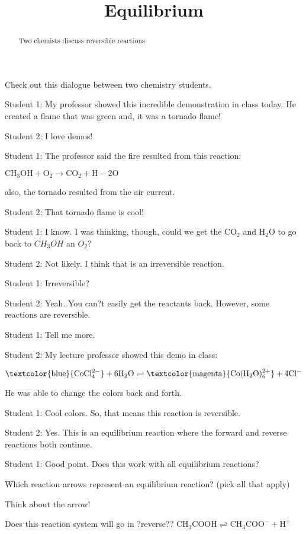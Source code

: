 \documentclass{ximera}
\title{Equilibrium}
\begin{document}
\begin{abstract}
Two chemists discuss reversible reactions.
\end{abstract}
\maketitle




Check out this dialogue between two chemistry students. 

Student 1: My professor showed this incredible demonstration in class today. He created a flame that was green and, it was a tornado flame!

Student 2: I love demos!

Student 1: The professor said the fire resulted from this reaction:

        $\mathrm{CH_3OH + O_2 \rightarrow CO_2 + H-2O}$

    also, the tornado resulted from the air current. 

Student 2: That tornado flame is cool!

Student 1: I know. I was thinking, though, could we get the $\mathrm{CO_2}$ and $\mathrm{H_2O}$ to go back to $CH_3OH$ an $O_2$?

Student 2: Not likely. I think that is an irreversible reaction. 

Student 1: Irreversible?

Student 2: Yeah. You can?t easily get the reactants back. However, some reactions are reversible. 

Student 1: Tell me more.

Student 2: My lecture professor showed this demo in class:

    $\mathrm{\textcolor{blue}{CoCl_{4}^{ 2-}}+ 6H_2O  \rightleftharpoons \textcolor{magenta}{Co(H_2O)_6^{ 2+}} + 4Cl^-}$
   

    He was able to change the colors back and forth.

Student 1: Cool colors. So, that means this reaction is reversible.

Student 2: Yes. This is an equilibrium reaction where the forward and reverse reactions both continue.

Student 1: Good point. Does this work with all equilibrium reactions?


\begin{question}
Which reaction arrows represent an equilibrium reaction? (pick all that apply)
%
\begin{selectAll}
	\choice{$\leftarrow$}
	\choice[correct]{$\rightleftharpoons$}
	\choice{$\leftrightarrow$}
	\choice[correct]{$\leftrightharpoons$}
	\choice{$\Leftarrow$}
\begin{hint}
Think about the arrow!
\end{hint}
 \end{selectAll}

\end{question}

\begin{question}
Does this reaction system will go in ?reverse??
%
 $\mathrm{CH_{3}COOH \rightleftharpoons CH_{3}COO^- + H^+}$
 \begin{multipleChoice}
\end{multipleChoice}
\end{question}
\end{document}
